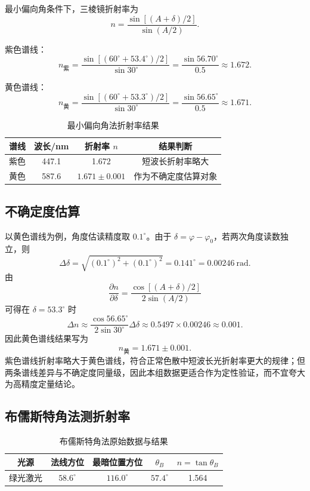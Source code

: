 \documentclass[UTF8,12pt,a4paper]{ctexart}
\begin{document}
最小偏向角条件下，三棱镜折射率为
\[
    n=\frac{\sin[(A+\delta)/2]}{\sin(A/2)} .
\]

紫色谱线：
\[
 n_{\text{紫}}=
 \frac{\sin[(60^\circ+53.4^\circ)/2]}{\sin30^\circ}
 =\frac{\sin56.70^\circ}{0.5}
 \approx 1.672 .
\]

黄色谱线：
\[
 n_{\text{黄}}=
 \frac{\sin[(60^\circ+53.3^\circ)/2]}{\sin30^\circ}
 =\frac{\sin56.65^\circ}{0.5}
 \approx 1.671 .
\]

\begin{table}[H]
\centering
\caption{最小偏向角法折射率结果}
\small
\begin{tabular}{cccc}
\toprule
谱线 & 波长/nm & 折射率 \(n\) & 结果判断 \\
\midrule
紫色 & 447.1 & 1.672 & 短波长折射率略大 \\
黄色 & 587.6 & \(1.671\pm0.001\) & 作为不确定度估算对象 \\
\bottomrule
\end{tabular}
\end{table}

\subsection{不确定度估算}

以黄色谱线为例，角度估读精度取 \(0.1^\circ\)。由于 \(\delta=\varphi-\varphi_0\)，若两次角度读数独立，则
\[
    \Delta \delta=\sqrt{(0.1^\circ)^2+(0.1^\circ)^2}
    =0.141^\circ
    =0.00246\ \text{rad}.
\]
由
\[
    \frac{\partial n}{\partial \delta}
    =\frac{\cos[(A+\delta)/2]}{2\sin(A/2)}
\]
可得在 \(\delta=53.3^\circ\) 时
\[
    \Delta n
    \approx
    \frac{\cos56.65^\circ}{2\sin30^\circ}\Delta\delta
    \approx 0.5497\times0.00246
    \approx 0.001 .
\]
因此黄色谱线结果写为
\[
    n_{\text{黄}}=1.671\pm0.001 .
\]
紫色谱线折射率略大于黄色谱线，符合正常色散中短波长光折射率更大的规律；但两条谱线差异与不确定度同量级，因此本组数据更适合作为定性验证，而不宜夸大为高精度定量结论。

\subsection{布儒斯特角法测折射率}

\begin{table}[H]
\centering
\caption{布儒斯特角法原始数据与结果}
\small
\begin{tabular}{ccccc}
\toprule
光源 & 法线方位 & 最暗位置方位 & \(\theta_B\) & \(n=\tan\theta_B\) \\
\midrule
绿光激光 & \(58.6^\circ\) & \(116.0^\circ\) & \(57.4^\circ\) & 1.564 \\
\bottomrule
\end{tabular}
\end{table}
\end{document}
